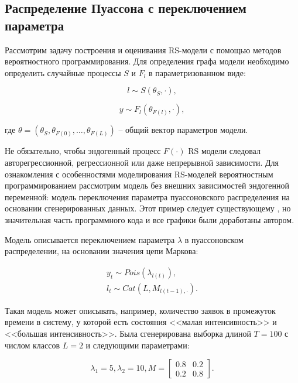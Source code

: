 \documentclass[a4paper,14pt]{extreport}
\begin{document}
\subsection{Распределение Пуассона с переключением параметра}

Рассмотрим задачу построения и оценивания RS-модели с помощью методов вероятностного программирования. Для определения графа модели необходимо определить случайные процессы $S$ и $F_l$ в параметризованном виде:

\begin{equation}
	l \sim S(\theta_S, \cdot) ,
\end{equation}

\begin{equation}
	y \sim F_l(\theta_{F(l)},\cdot) ,
\end{equation}

\noindent
где $\theta = (\theta_S, \theta_{F(0)}, \dots, \theta_{F(L)}) $ -- общий вектор параметров модели. 

Не обязательно, чтобы эндогенный процесс $F(\cdot)$ RS модели следовал авторегрессионной, регрессионной или даже непрерывной зависимости. Для ознакомления с особенностями моделирования RS-моделей вероятностным программированием рассмотрим модель без внешних зависимостей эндогенной переменной: модель переключения параметра пуассоновского распределения на основании сгенерированных данных. Этот пример следует существующему \cite{blog_hidden_markov_ravinutala}, но значительная часть программного кода и все графики были доработаны автором.

Модель описывается переключением параметра $\lambda$ в пуассоновском распределении, на основании значения цепи Маркова:

\begin{equation}
	\label{eq:ms_pois_equation}
	\begin{aligned}
		y_t \sim \mathit{Pois}(\lambda_{l(t)}) , \\
		l_t \sim \mathit{Cat}(L, M_{l(t-1), \cdot}) .
	\end{aligned}
\end{equation}

Такая модель может описывать, например, количество заявок в промежуток времени в систему, у которой есть состояния <<малая интенсивность>> и <<большая интенсивность>>. Была сгенерирована выборка длиной $T=100$ с числом классов $L=2$ и следующими параметрами:

\begin{equation}
	\label{eq:ms_pois_coef_true}
	\lambda_1 = 5, 
	\lambda_2 = 10,
	M = \left[ {\begin{array}{cc}
					0.8 & 0.2 \\
					0.2 & 0.8
				\end{array} } \right]
	.
\end{equation}
\end{document}

